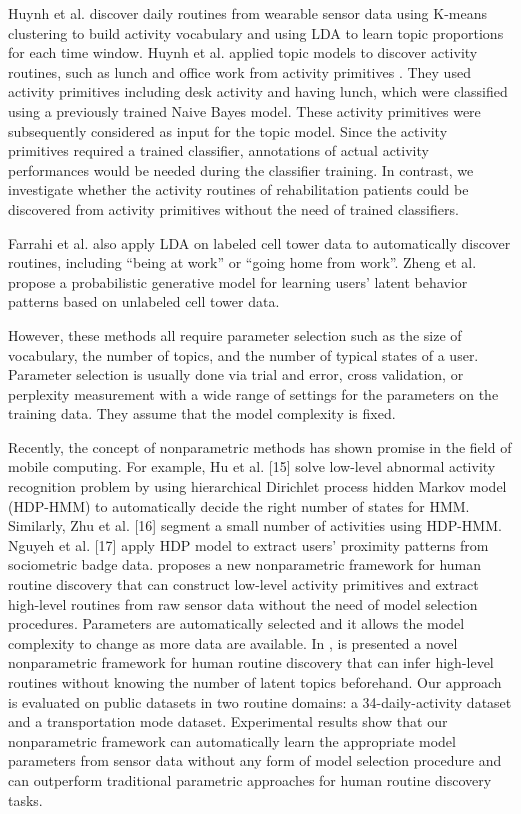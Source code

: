 Huynh et al. \cite{Huynh_2008} discover daily routines from wearable sensor data using K-means clustering to build activity vocabulary 
and using LDA to learn topic proportions for each time window.
Huynh et al. applied topic models to discover activity routines, such as lunch and office work from activity primitives \cite{Huynh_2008}.
They used activity primitives including desk activity and having lunch, which were classified using a previously trained Naive Bayes model.
These activity primitives were subsequently considered as input for the topic model. Since the activity primitives required a trained classifier, 
annotations of actual activity performances would be needed during the classifier training. In contrast, we investigate whether the activity 
routines of rehabilitation patients could be discovered from activity primitives without the need of trained classifiers. 

Farrahi et al. \cite{Farrahi_2011} also apply LDA on labeled cell tower data to automatically discover routines, including “being at work” or 
“going home from work”. Zheng et al. \cite{Zheng_2012} propose a probabilistic generative model for learning users' latent behavior patterns based on 
unlabeled cell tower data. 

However, these methods all require parameter selection such as the size of vocabulary, 
the number of topics, and the number of typical states of a user. Parameter selection is usually 
done via trial and error, cross validation, or perplexity measurement with a wide range of settings 
for the parameters on the training data. They assume that the model complexity is fixed.

Recently, the concept of nonparametric methods has shown
promise in the field of mobile computing. For example, Hu et
al. [15] solve low-level abnormal activity recognition problem
by using hierarchical Dirichlet process hidden Markov model
(HDP-HMM) to automatically decide the right number of
states for HMM. Similarly, Zhu et al. [16] segment a small
number of activities using HDP-HMM. Nguyeh et al. [17]
apply HDP model to extract users’ proximity patterns from
sociometric badge data.  \cite{Sun_2014} proposes a new nonparametric framework for 
human routine discovery that can construct low-level activity primitives and extract high-level 
routines from raw sensor data without the need of model selection procedures. Parameters are automatically 
selected and it allows the model complexity to change as more data are available.
In \cite{Sun_2014}, is presented a novel nonparametric framework for human routine discovery that can 
infer high-level routines without knowing the number of latent topics beforehand. Our approach is evaluated on 
public datasets in two routine domains: a 34-daily-activity dataset and a transportation mode dataset. Experimental 
results show that our nonparametric framework can automatically learn the appropriate model parameters from sensor data 
without any form of model selection procedure and can outperform traditional parametric approaches for human routine discovery tasks.



